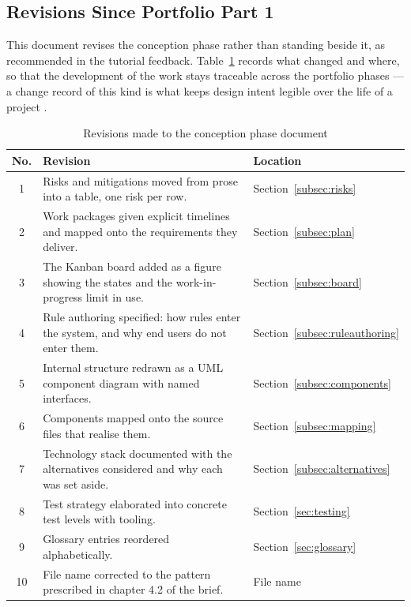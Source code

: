 \documentclass[a4paper,11pt]{article}
\begin{document}
\subsection{Revisions Since Portfolio Part 1}\label{subsec:changes}

This document revises the conception phase rather than standing beside it, as
recommended in the tutorial feedback. Table~\ref{tab:changes} records what
changed and where, so that the development of the work stays traceable across
the portfolio phases --- a change record of this kind is what keeps design
intent legible over the life of a project \citep{Bass2021}.

\begin{table}[H]
\centering
\caption{Revisions made to the conception phase document}
\label{tab:changes}
\footnotesize
\renewcommand{\arraystretch}{1.2}
\setlength{\tabcolsep}{4pt}
\begin{tabularx}{\textwidth}{|c|X|p{3.3cm}|}
\hline
\rowcolor{gray!15}
\textbf{No.} & \textbf{Revision} & \textbf{Location} \\
\hline
\hline
1  & Risks and mitigations moved from prose into a table, one risk per row. & Section~\ref{subsec:risks} \\
\hline
2  & Work packages given explicit timelines and mapped onto the requirements they deliver. & Section~\ref{subsec:plan} \\
\hline
3  & The Kanban board added as a figure showing the states and the work-in-progress limit in use. & Section~\ref{subsec:board} \\
\hline
4  & Rule authoring specified: how rules enter the system, and why end users do not enter them. & Section~\ref{subsec:ruleauthoring} \\
\hline
5  & Internal structure redrawn as a UML component diagram with named interfaces. & Section~\ref{subsec:components} \\
\hline
6  & Components mapped onto the source files that realise them. & Section~\ref{subsec:mapping} \\
\hline
7  & Technology stack documented with the alternatives considered and why each was set aside. & Section~\ref{subsec:alternatives} \\
\hline
8  & Test strategy elaborated into concrete test levels with tooling. & Section~\ref{sec:testing} \\
\hline
9  & Glossary entries reordered alphabetically. & Section~\ref{sec:glossary} \\
\hline
10 & File name corrected to the pattern prescribed in chapter 4.2 of the brief. & File name \\
\hline
\end{tabularx}
\end{table}
\end{document}
